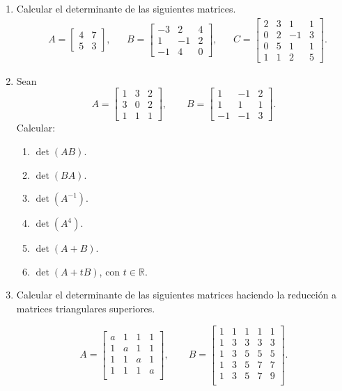 \begin{enumerate}[topsep=6pt,itemsep=.4cm]
\item Calcular el determinante de las siguientes matrices.
	\begin{align*}
	&A=\begin{bmatrix} 4&7\\ 5&3\end{bmatrix},
	&&B=\begin{bmatrix} -3&2&4\\ 1&-1&2\\ -1&4&0\end{bmatrix},
	&&
	C=\begin{bmatrix} 2&3&1&1\\ 0&2&-1&3 \\ 0&5&1&1 \\1&1&2&5\end{bmatrix}.
	\end{align*}

	
\item Sean
		$$A=
	\begin{bmatrix}
		1&3&2 \\
		3&0&2 \\
		1&1&1
	\end{bmatrix}, \qquad
	B =
	\begin{bmatrix}
		1&-1&2\\
		1&1&1 \\
		-1&-1&3
	\end{bmatrix}.
	$$
	Calcular:
	\begin{multicols}{3}
	\begin{enumerate}
		\item $\det(AB)$.
		\item $\det(BA)$.
		\item $\det(A^{-1})$.
		\item $\det(A^{4})$.
		\item $\det(A+B)$.
		\item $\det(A+tB)$, con $t \in \mathbb{R}$.
	\end{enumerate}
\end{multicols}


\item Calcular el determinante de las siguientes matrices haciendo la reducción a matrices triangulares superiores.

		$$A =
		\begin{bmatrix}
			a&1&1&1 \\
			1&a&1&1 \\
			1&1&a&1 \\
			1&1&1&a \\
		\end{bmatrix}, \qquad	
        B =
		\begin{bmatrix}
			1&1&1&1&1 \\
			1&3&3&3&3 \\
			1&3&5&5&5 \\
			1&3&5&7&7 \\
			1&3&5&7&9 \\
		\end{bmatrix}.
		$$


\end{enumerate}
